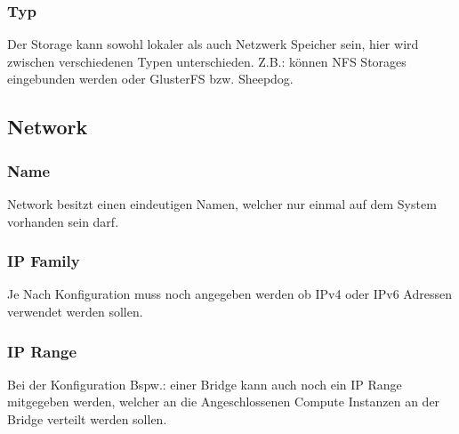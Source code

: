 \documentclass[11pt]{scrartcl}
\begin{document}
\subsubsection{Typ}
Der Storage kann sowohl lokaler als auch Netzwerk Speicher sein, hier wird 
zwischen verschiedenen Typen unterschieden.
Z.B.: können NFS Storages eingebunden werden oder GlusterFS bzw. Sheepdog.

\subsection{Network}
\subsubsection{Name}
Network besitzt einen eindeutigen Namen, welcher nur einmal auf dem System 
vorhanden sein darf.

\subsubsection{IP Family}
Je Nach  Konfiguration muss noch angegeben werden ob IPv4 oder IPv6 Adressen 
verwendet werden sollen.

\subsubsection{IP Range}
Bei der Konfiguration Bspw.: einer Bridge kann auch noch ein IP Range mitgegeben 
werden, welcher an die Angeschlossenen Compute Instanzen an der Bridge verteilt 
werden sollen.
\end{document}
